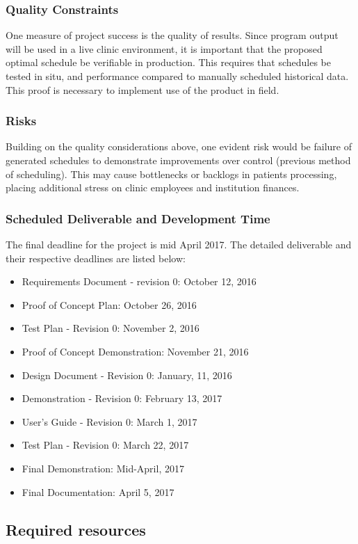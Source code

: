 \documentclass[12pt, titlepage]{article}
\begin{document}
\subsubsection{Quality Constraints}
One measure of project success is the quality of results. Since program output will be used in a live clinic environment, it is important that the proposed optimal schedule be verifiable in production. This requires that schedules be tested in situ, and performance compared to manually scheduled historical data. This proof is necessary to implement use of the product in field.
\newline\
\subsubsection{Risks}
Building on the quality considerations above, one evident risk would be failure of generated schedules to demonstrate improvements over control (previous method of scheduling). This may cause bottlenecks or backlogs in patients processing, placing additional stress on clinic employees and institution finances. 
\newline\
\subsubsection{Scheduled Deliverable and Development Time}
The final deadline for the project is mid April 2017. The detailed deliverable and their respective deadlines are listed below:
\begin{itemize}
  \item Requirements Document - revision 0: October 12, 2016 
  \item Proof of Concept Plan: October 26, 2016
  \item Test Plan - Revision 0: November 2, 2016
  \item Proof of Concept Demonstration: November 21, 2016
  \item Design Document - Revision 0: January, 11, 2016
  \item Demonstration - Revision 0: February 13, 2017
  \item User’s Guide - Revision 0: March 1, 2017
  \item Test Plan - Revision 0: March 22, 2017
  \item Final Demonstration: Mid-April, 2017
  \item Final Documentation: April 5, 2017
\end{itemize}

\subsection{Required resources}
\end{document}
